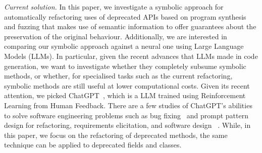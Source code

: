 \documentclass[10pt,conference]{IEEEtran}
\begin{document}
\emph{Current solution.}  In this paper, we investigate a symbolic approach for automatically refactoring uses of deprecated APIs based on program synthesis and fuzzing that makes use of semantic information
to offer guarantees about the preservation of the original behaviour.
Additionally, we are interested in comparing our symbolic approach against a neural one using Large Language Models (LLMs).
In particular, given the recent advances that LLMs made in code generation,
we want to investigate whether they completely subsume symbolic methods, or whether, for specialised tasks such as the current refactoring,
symbolic methods are still useful at lower computational costs.
%
%
Given its recent attention, we picked ChatGPT~\cite{chatgpt}, which is a LLM trained using Reinforcement Learning from Human Feedback.
There are a few studies of ChatGPT's abilities to solve software engineering problems such as bug fixing~\cite{sobania2023analysis,chatgptbugs} and 
prompt pattern design for refactoring, requirements elicitation, and software design ~\cite{white2023chatgpt}.
%
%
While, in this paper, we focus on the refactoring of deprecated methods, the same
technique can be applied to deprecated fields and classes.

%

\end{document}
